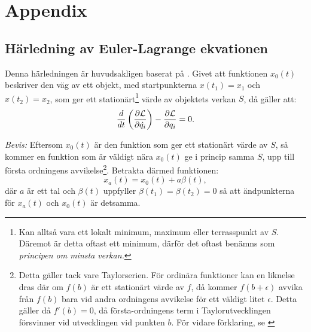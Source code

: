 \chapter*{Appendix}
\appendix

\renewcommand{\thesection}{\Alph{section}}

\section{Härledning av Euler-Lagrange ekvationen} \label{appendix:euler_lagrange_equation}
    Denna härledningen är huvudsakligen baserat på \cite[s. 222-223]{book:classical_mechanics:Morin2007}. Givet att funktionen $x_0(t)$ beskriver den väg av ett objekt, med startpunkterna $x(t_1) = x_1$ och $x(t_2) = x_2$, som ger ett stationärt\footnote{Kan alltså vara ett lokalt minimum, maximum eller terrasspunkt av $S$. Däremot är detta oftast ett minimum, därför det oftast benämns som \emph{principen om \emph{minsta} verkan.}} värde av objektets verkan $S$, då gäller att:
    \begin{equation}
        \frac{d}{dt}\left( \frac{\partial \mathcal{L}}{\partial \dot{q_{i}}} \right) - \frac{\partial \mathcal{L}}{\partial q_{i}} = 0. 
        \label{appendix:euler_lagrange_equation_math}
    \end{equation}

    \textit{Bevis:} Eftersom $x_0(t)$ är den funktion som ger ett stationärt värde av $S$, så kommer en funktion som är väldigt nära $x_0(t)$ ge i princip samma $S$, upp till första ordningens avvikelse\footnote{Detta gäller tack vare Taylorserien. För ordinära funktioner kan en liknelse dras där om $f(b)$ är ett stationärt värde av $f$, då kommer $f(b + \epsilon)$ avvika från $f(b)$ bara vid andra ordningens avvikelse för ett väldigt litet $\epsilon$. Detta gäller då $f'(b) = 0$, då första-ordningens term i Taylorutvecklingen försvinner vid utvecklingen vid punkten $b$. För vidare förklaring, se \cite[s. 222]{book:classical_mechanics:Morin2007}}. Betrakta därmed funktionen:
    \begin{equation}
        x_a(t) = x_0(t) + a\beta(t), \label{appendix:x_a(t)_definition}
    \end{equation}
    där $a$ är ett tal och $\beta(t)$ uppfyller $\beta(t_1) = \beta(t_2) = 0$ så att ändpunkterna för $x_a(t)$ och $x_0(t)$ är detsamma. 
    
